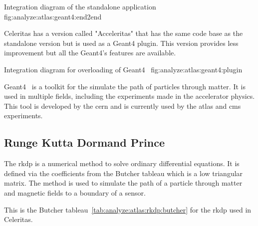 {Integration diagram of the standalone application~\cite{celeritas-overview-tognini}}
{fig:analyze:atlas:geant4:end2end}


Celeritas has a version called "Acceleritas" that has the same code base as the
standalone version but is used as a Geant4 plugin.
This version provides less improvement but all the Geant4's features are available.

    {Integration diagram for overloading of Geant4~\cite{celeritas-overview-tognini}}
    {fig:analyze:atlas:geant4:plugin}

Geant4~\cite{geant4} is a toolkit for the simulate the path of particles through
matter.
It is used in multiple fields, including the experiments made in the
accelerator physics.
This tool is developed by the \acrfull{cern} and is currently used by the
\acrfull{atlas} and \acrfull{cms} experiments.


\subsection{Runge Kutta Dormand Prince}
\label{ch:analyze:atlas:rkdp}

The \acrfull{rkdp} is a numerical method to solve ordinary differential equations.
It is defined via the coefficients from the Butcher tableau which is a low triangular
matrix.
The method is used to simulate the path of a particle through matter and
magnetic fields to a boundary of a sensor.

This is the Butcher tableau~\ref{tab:analyze:atlas:rkdp:butcher} for the \acrshort{rkdp} used in Celeritas.

